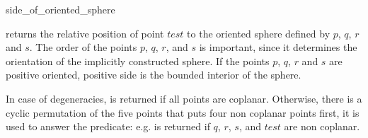 \begin{ccRefFunction}{side_of_oriented_sphere}

         {returns the relative position of point $test$ to the oriented sphere defined
by $p$, $q$, $r$ and $s$. The order of the points $p$, $q$, $r$, and $s$ is important,
since it determines the orientation of the implicitly constructed
sphere. If the points $p$, $q$, $r$ and $s$ are positive oriented, positive side
is the bounded interior of the sphere.

In case of degeneracies,  is returned
if all points are coplanar. Otherwise, there is a cyclic permutation of the five points
that puts four non coplanar points first, it is used to answer the predicate:
e.g.  is returned if $q$, $r$, $s$,
and $test$ are non coplanar. }

\ccSeeAlso

 \\

\end{ccRefFunction}

